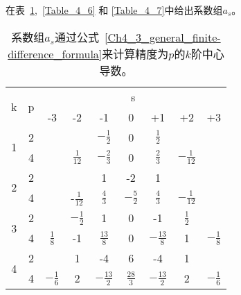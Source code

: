 \documentclass[twoside]{book}
\begin{document}
\begin{CJK*}{GBK}{song}
在表~\ref{Table_4_5},~\ref{Table_4_6} 和 \ref{Table_4_7}中给出系数组$a_s$。
\begin{table}[t!]
	\begin{center}
		\begin{tabular}{c|c||c|c|c|c|c|c|c}
			\multirow{2}{1em}{k} & \multirow{2}{1em}{p} & \multicolumn{7}{c}{s} \\
			\cline{3-9}
			&  & -3 & -2 & -1 & 0 & +1 & +2 & +3 \\
			\hline\hline
			\multirow{2}{1em}{1} & 2 &  &  & $-\frac{1}{2}$ & 0 & $\frac{1}{2}$ &  &  \\
			\cline{2-9}
			& 4 &  & $\frac{1}{12}$ & $-\frac{2}{3}$ & 0 & $\frac{2}{3}$ & $-\frac{1}{12}$ &  \\
			\hline
			\multirow{2}{1em}{2} & 2 &  &  & 1 & -2 & 1 & &  \\
			\cline{2-9}
			& 4 &  & -$\frac{1}{12}$ & $\frac{4}{3}$ & $-\frac{5}{2}$ & $\frac{4}{3}$ & $-\frac{1}{12}$ &  \\
			\hline
			\multirow{2}{1em}{3} & 2 &  & $-\frac{1}{2}$ & 1 & 0 & -1 & $\frac{1}{2}$ &  \\
			\cline{2-9}
			& 4 & $\frac{1}{8}$ & -1 & $\frac{13}{8}$ & 0 & $-\frac{13}{8}$ & 1 & $-\frac{1}{8}$ \\
			\hline
			\multirow{2}{1em}{4} & 2 &  & 1 & -4 & 6 & -4 & 1 &  \\
			\cline{2-9}
			& 4 & $-\frac{1}{6}$ & 2 & $-\frac{13}{2}$ & $\frac{28}{3}$ & $-\frac{13}{2}$ & 2 & $-\frac{1}{6}$
		\end{tabular}
	\end{center}
	\caption{系数组$a_s$通过公式~\eqref{Ch4_3_general_finite-difference_formula}来计算精度为$p$的$k$阶中心导数。}
	\label{Table_4_5}
\end{table}


\end{CJK*}
\end{document}
